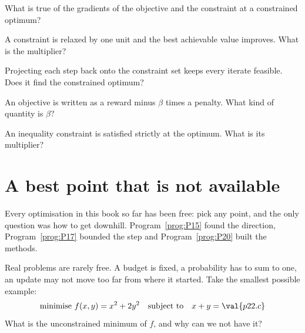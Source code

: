 \begin{quiz}
\item What is true of the gradients of the objective and the constraint at a
  constrained optimum? 
\item A constraint is relaxed by one unit and the best achievable value
  improves. What is the multiplier? 
\item Projecting each step back onto the constraint set keeps every iterate
  feasible. Does it find the constrained optimum? 
\item An objective is written as a reward minus $\beta$ times a penalty. What
  kind of quantity is $\beta$? 
\item An inequality constraint is satisfied strictly at the optimum. What is
  its multiplier? 
\end{quiz}

\section{A best point that is not available}
\label{sec:P22-constraint}

\begin{fr}
Every optimisation in this book so far has been free: pick any point, and the
only question was how to get downhill. Program~\ref{prog:P15} found the
direction, Program~\ref{prog:P17} bounded the step and Program~\ref{prog:P20}
built the methods.

Real problems are rarely free. A budget is fixed, a probability has to sum to
one, an update may not move too far from where it started. Take the smallest
possible example:
\[ \text{minimise } f(x,y) = x^{2} + 2y^{2}
   \quad\text{subject to}\quad x + y = \val{p22.c} \]
What is the unconstrained minimum of $f$, and why can we not have it?
\dotline
\nextframe
\end{fr}

